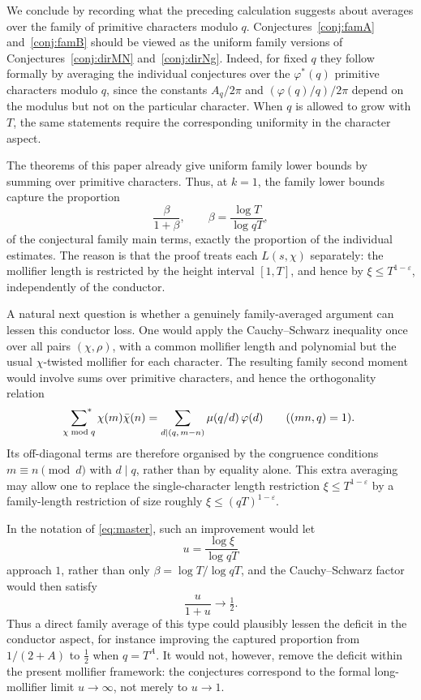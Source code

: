 \documentclass[10pt,a4paper]{amsart}
\numberwithin{equation}{section}
\begin{document}
We conclude by recording what the preceding calculation suggests about averages over the family of primitive characters modulo $q$. Conjectures~\ref{conj:famA} and~\ref{conj:famB} should be viewed as the uniform family versions of Conjectures~\ref{conj:dirMN} and~\ref{conj:dirNg}. Indeed, for fixed $q$ they follow formally by averaging the individual conjectures over the $\varphi^*(q)$ primitive characters modulo $q$, since the constants $A_q/2\pi$ and $(\varphi(q)/q)/2\pi$ depend on the modulus but not on the particular character. When $q$ is allowed to grow with $T$, the same statements require the corresponding uniformity in the character aspect.

The theorems of this paper already give uniform family lower bounds by summing over primitive characters. Thus, at $k=1$, the family lower bounds capture the proportion
\[
\frac{\beta}{1+\beta},
\qquad
\beta=\frac{\log T}{\log qT},
\]
of the conjectural family main terms, exactly the proportion of the individual estimates. The reason is that the proof treats each $L(s,\chi)$ separately: the mollifier length is restricted by the height interval $[1,T]$, and hence by $\xi\le T^{1-\varepsilon}$, independently of the conductor.

A natural next question is whether a genuinely family-averaged argument can lessen this conductor loss. One would apply the Cauchy--Schwarz inequality once over all pairs $(\chi,\rho)$, with a common mollifier length and polynomial but the usual $\chi$-twisted mollifier for each character. The resulting family second moment would involve sums over primitive characters, and hence the orthogonality relation
\[
\sideset{}{^*}\sum_{\chi\bmod q}\chi(m)\bar\chi(n)=\sum_{d\mid(q,\,m-n)}\mu(q/d)\,\varphi(d)\qquad((mn,q)=1).
\]
Its off-diagonal terms are therefore organised by the congruence conditions $m\equiv n\pmod d$ with $d\mid q$, rather than by equality alone. This extra averaging may allow one to replace the single-character length restriction $\xi\le T^{1-\varepsilon}$ by a family-length restriction of size roughly $\xi\le(qT)^{1-\varepsilon}$.

In the notation of \eqref{eq:master}, such an improvement would let
\[
u=\frac{\log \xi}{\log qT}
\]
approach $1$, rather than only $\beta=\log T/\log qT$, and the Cauchy--Schwarz factor would then satisfy
\[
\frac{u}{1+u}\longrightarrow \tfrac12 .
\]
Thus a direct family average of this type could plausibly lessen the deficit in the conductor aspect, for instance improving the captured proportion from $1/(2+A)$ to $\tfrac12$ when $q=T^{A}$. It would not, however, remove the deficit within the present mollifier framework: the conjectures correspond to the formal long-mollifier limit $u\to\infty$, not merely to $u\to1$.
\end{document}
